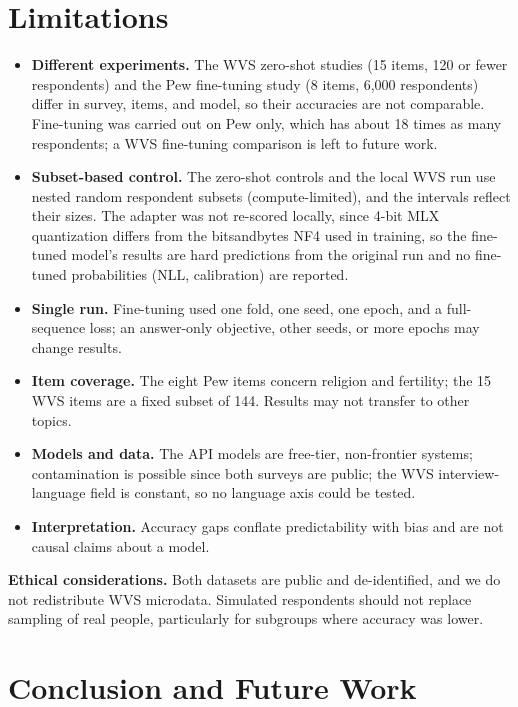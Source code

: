 \documentclass[conference]{IEEEtran}
\begin{document}
\section{Limitations}

\begin{itemize}
    \item \textbf{Different experiments.} The WVS zero-shot studies (15 items, 120 or fewer respondents) and the Pew fine-tuning study (8 items, 6{,}000 respondents) differ in survey, items, and model, so their accuracies are not comparable. Fine-tuning was carried out on Pew only, which has about 18 times as many respondents; a WVS fine-tuning comparison is left to future work.
    \item \textbf{Subset-based control.} The zero-shot controls and the local WVS run use nested random respondent subsets (compute-limited), and the intervals reflect their sizes. The adapter was not re-scored locally, since 4-bit MLX quantization differs from the bitsandbytes NF4 used in training, so the fine-tuned model's results are hard predictions from the original run and no fine-tuned probabilities (NLL, calibration) are reported.
    \item \textbf{Single run.} Fine-tuning used one fold, one seed, one epoch, and a full-sequence loss; an answer-only objective, other seeds, or more epochs may change results.
    \item \textbf{Item coverage.} The eight Pew items concern religion and fertility; the 15 WVS items are a fixed subset of 144. Results may not transfer to other topics.
    \item \textbf{Models and data.} The API models are free-tier, non-frontier systems; contamination is possible since both surveys are public; the WVS interview-language field is constant, so no language axis could be tested.
    \item \textbf{Interpretation.} Accuracy gaps conflate predictability with bias and are not causal claims about a model.
\end{itemize}

\textbf{Ethical considerations.} Both datasets are public and de-identified, and we do not redistribute WVS microdata. Simulated respondents should not replace sampling of real people, particularly for subgroups where accuracy was lower.

\section{Conclusion and Future Work}
\end{document}
